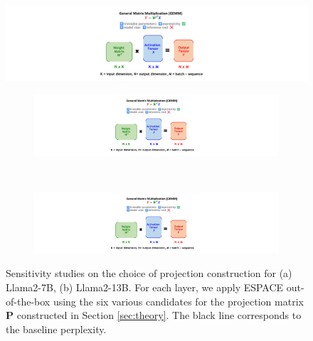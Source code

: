 \documentclass{article}
\theoremstyle{plain}
\begin{document}
\begin{figure}[!t]
\begin{center}
    \includegraphics[trim=0cm 17cm 19cm 0cm, clip, width = 0.95\linewidth,page=6]{espace_paper_figures.pdf}
    
    \begin{subfigure}[t]{0.7\textwidth}
    \centering     
    \includegraphics[trim=21.5cm 0.5cm 22cm 0.5cm, clip, width = 0.95\linewidth,page=14]{espace_paper_figures.pdf}
    \caption{}    
    \end{subfigure}\\
    \begin{subfigure}[t]{0.7\textwidth}
    \centering     
    \includegraphics[trim=21.5cm 0.5cm 22cm 0.5cm, clip, width = 0.95\linewidth,page=15]{espace_paper_figures.pdf}
    \caption{}    
    \end{subfigure}
\end{center}
\caption{\footnotesize Sensitivity studies on the choice of projection construction for (a) Llama2-7B, (b) Llama2-13B. For each layer, we apply ESPACE out-of-the-box using the six various candidates for the projection matrix $\mathbf{P}$ constructed in Section \ref{sec:theory}. The black line corresponds to the baseline perplexity.}
\label{fig:sensistivities_llama}
\end{figure}
\end{document}
